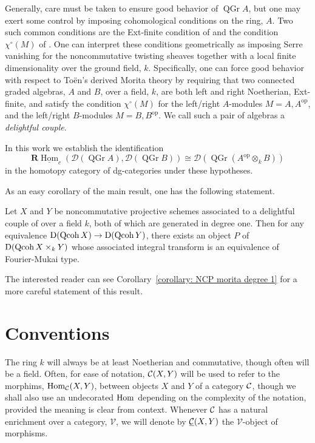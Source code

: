 Generally, care must be taken to ensure good behavior of \(\operatorname{QGr} A\), but one may exert some control by imposing cohomological conditions on the ring, \(A\).
Two such common conditions are the Ext-finite condition of \textcite{BVdB} and the condition \(\chi^\circ(M)\) of \textcite{AZ94}.
One can interpret these conditions geometrically as imposing Serre vanishing for the noncommutative twisting sheaves together with a local finite dimensionality over the ground field, \(k\).
Specifically, one can force good behavior with respect to To\"en's derived Morita theory by requiring that two connected graded algebras, \(A\) and \(B\), over a field, \(k\), are both left and right Noetherian, Ext-finite, and satisfy the condition \(\chi^\circ(M)\) for the left/right \(A\)-modules \(M = A, A^{\operatorname{op}}\), and the left/right \(B\)-modules \(M = B, B^{\operatorname{op}}\).
We call such a pair of algebras a \textit{delightful couple}.

In this work we establish the identification
\[\mathbf{R}\underline{\operatorname{Hom}}_c(\mathcal{D}(\operatorname{QGr} A), \mathcal{D}(\operatorname{QGr} B)) \cong \mathcal{D}(\operatorname{QGr}(A^{\operatorname{op}} \otimes_k B))\]
in the homotopy category of dg-categories under these hypotheses.

As an easy corollary of the main result, one has the following statement.
\begin{theorem}
  Let \(X\) and \(Y\) be noncommutative projective schemes associated to a delightful couple of over a field \(k\), both of which are generated in degree one.
  Then for any equivalence \(\mathrm{D}(\operatorname{Qcoh}X) \to \mathrm{D}(\operatorname{Qcoh}Y)\), there exists an object \(P\) of \(\mathrm{D}(\operatorname{Qcoh}X \times_k Y)\) whose associated integral transform is an equivalence of Fourier-Mukai type.
\end{theorem}

\noindent
The interested reader can see Corollary~\ref{corollary: NCP morita degree 1} for a more careful statement of this result.

\section*{Conventions}
The ring \(k\) will always be at least Noetherian and commutative, though often will be a field.
Often, for ease of notation, \(\mathcal{C}(X,Y)\) will be used to refer to the morphims, \(\operatorname{Hom}_{\mathcal{C}}(X,Y)\), between objects \(X\) and \(Y\) of a category \(\mathcal{C}\), though we shall also use an undecorated \(\operatorname{Hom}\) depending on the complexity of the notation, provided the meaning is clear from context. 
Whenever \(\mathcal{C}\) has a natural enrichment over a category, \(\mathcal{V}\), we will denote by \(\underline{\mathcal{C}}(X,Y)\) the \(\mathcal{V}\)-object of morphisms.

